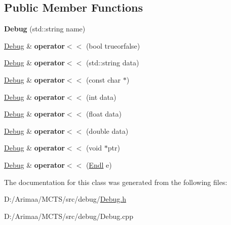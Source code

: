 \subsection*{Public Member Functions}
\begin{DoxyCompactItemize}
\item 
\hypertarget{class_debug_aa3d497342881383c89e096b6cb600fce}{{\bfseries Debug} (std\+::string name)}\label{class_debug_aa3d497342881383c89e096b6cb600fce}

\item 
\hypertarget{class_debug_a8307c9d6a8be66b50950cc85b51800fa}{\hyperlink{class_debug}{Debug} \& {\bfseries operator$<$$<$} (bool trueorfalse)}\label{class_debug_a8307c9d6a8be66b50950cc85b51800fa}

\item 
\hypertarget{class_debug_acfd3f3dc54ad8308a2677393327398c4}{\hyperlink{class_debug}{Debug} \& {\bfseries operator$<$$<$} (std\+::string data)}\label{class_debug_acfd3f3dc54ad8308a2677393327398c4}

\item 
\hypertarget{class_debug_ae94245586ffce3b8b74a66e144740a8f}{\hyperlink{class_debug}{Debug} \& {\bfseries operator$<$$<$} (const char $\ast$)}\label{class_debug_ae94245586ffce3b8b74a66e144740a8f}

\item 
\hypertarget{class_debug_a62e1823c3175a3165d72a1f983e83bc9}{\hyperlink{class_debug}{Debug} \& {\bfseries operator$<$$<$} (int data)}\label{class_debug_a62e1823c3175a3165d72a1f983e83bc9}

\item 
\hypertarget{class_debug_a094b4f5fa9f210be6600c183f6d91427}{\hyperlink{class_debug}{Debug} \& {\bfseries operator$<$$<$} (float data)}\label{class_debug_a094b4f5fa9f210be6600c183f6d91427}

\item 
\hypertarget{class_debug_a2d6fcac593e4e1ff8e2846245fba9f0e}{\hyperlink{class_debug}{Debug} \& {\bfseries operator$<$$<$} (double data)}\label{class_debug_a2d6fcac593e4e1ff8e2846245fba9f0e}

\item 
\hypertarget{class_debug_a7ad6d6a2a8acbad5676160d3e2d7b44f}{\hyperlink{class_debug}{Debug} \& {\bfseries operator$<$$<$} (void $\ast$ptr)}\label{class_debug_a7ad6d6a2a8acbad5676160d3e2d7b44f}

\item 
\hypertarget{class_debug_acc6fc36920cced007f4c6d8c78a902dc}{\hyperlink{class_debug}{Debug} \& {\bfseries operator$<$$<$} (\hyperlink{struct_debug_1_1_endl}{Endl} e)}\label{class_debug_acc6fc36920cced007f4c6d8c78a902dc}

\end{DoxyCompactItemize}


The documentation for this class was generated from the following files\+:\begin{DoxyCompactItemize}
\item 
D\+:/\+Arimaa/\+M\+C\+T\+S/src/debug/\hyperlink{_debug_8h}{Debug.\+h}\item 
D\+:/\+Arimaa/\+M\+C\+T\+S/src/debug/Debug.\+cpp\end{DoxyCompactItemize}
